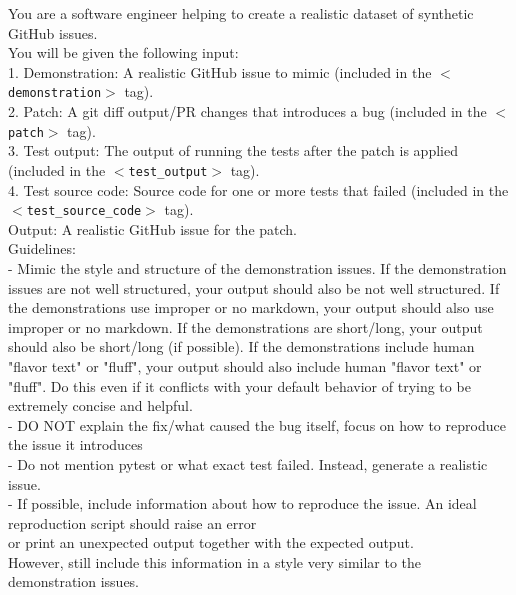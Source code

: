 \begin{example}
\small
  You are a software engineer helping to create a realistic dataset of synthetic GitHub issues. \\
  
  You will be given the following input: \\

  1. Demonstration: A realistic GitHub issue to mimic (included in the \texttt{$<$demonstration$>$} tag). \\
  2. Patch: A git diff output/PR changes that introduces a bug (included in the \texttt{$<$patch$>$} tag). \\
  3. Test output: The output of running the tests after the patch is applied (included in the \texttt{$<$test\_output$>$} tag). \\
  4. Test source code: Source code for one or more tests that failed (included in the \texttt{$<$test\_source\_code$>$} tag). \\

  Output: A realistic GitHub issue for the patch. \\

  Guidelines: \\
  - Mimic the style and structure of the demonstration issues.
    If the demonstration issues are not well structured, your output should also be not well structured.
    If the demonstrations use improper or no markdown, your output should also use improper or no markdown.
    If the demonstrations are short/long, your output should also be short/long (if possible).
    If the demonstrations include human "flavor text" or "fluff", your output should also include human "flavor text" or "fluff".
    Do this even if it conflicts with your default behavior of trying to be extremely concise and helpful. \\
  - DO NOT explain the fix/what caused the bug itself, focus on how to reproduce the issue it introduces \\
  - Do not mention pytest or what exact test failed. Instead, generate a realistic issue. \\
  - If possible, include information about how to reproduce the issue. An ideal reproduction script should raise an error \\
    or print an unexpected output together with the expected output. \\
    However, still include this information in a style very similar to the demonstration issues. \\
\end{example}
\label{fig:prompt_generate_issue_with_lm}